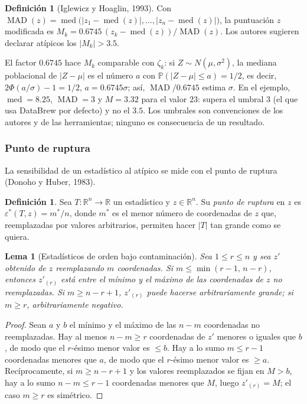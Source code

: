 \documentclass[11pt,a4paper]{article}
\theoremstyle{plain}
\newtheorem{lema}[teorema]{Lema}
\theoremstyle{definition}
\newtheorem{definicion}[teorema]{Definición}
\theoremstyle{remark}
\newcommand{\R}{\mathbb{R}}
\newcommand{\Prob}{\mathbb{P}}
\newcommand{\med}{\operatorname{med}}
\newcommand{\MAD}{\operatorname{MAD}}
\newcommand{\1}{\mathbf{1}}
\begin{document}
\begin{definicion}[Iglewicz y Hoaglin, 1993]
Con $\MAD(z)=\med\bigl(|z_1-\med(z)|,\dots,|z_n-\med(z)|\bigr)$, la
puntuación $z$ modificada es $M_k=0.6745\,(z_k-\med(z))/\MAD(z)$. Los
autores sugieren declarar atípicos los $|M_k|>3.5$.
\end{definicion}

El factor $0.6745$ hace $M_k$ comparable con $\zeta_k$: si $Z\sim
N(\mu,\sigma^2)$, la mediana poblacional de $|Z-\mu|$ es el número $a$ con
$\Prob(|Z-\mu|\le a)=1/2$, es decir, $2\Phi(a/\sigma)-1=1/2$, $a=0.6745\sigma$;
así, $\MAD/0.6745$ estima $\sigma$. En el ejemplo, $\med=8.25$, $\MAD=3$ y
$M=3.32$ para el valor $23$: supera el umbral $3$ (el que usa DataBrew
por defecto) y no el $3.5$. Los umbrales son convenciones de los autores
y de las herramientas; ninguno es consecuencia de un resultado.

\subsubsection{Punto de ruptura}\label{sec:ruptura}

La sensibilidad de un estadístico al atípico se mide con el punto de
ruptura (Donoho y Huber, 1983).

\begin{definicion}
Sea $T:\R^n\to\R$ un estadístico y $z\in\R^n$. Su \emph{punto de ruptura}
en $z$ es $\varepsilon^*(T,z)=m^*/n$, donde $m^*$ es el menor número de
coordenadas de $z$ que, reemplazadas por valores arbitrarios, permiten
hacer $|T|$ tan grande como se quiera.
\end{definicion}

\begin{lema}[Estadísticos de orden bajo contaminación]\label{lem:orden}
Sea $1\le r\le n$ y sea $z'$ obtenido de $z$ reemplazando $m$ coordenadas.
Si $m\le\min(r-1,\,n-r)$, entonces $z'_{(r)}$ está entre el mínimo y el
máximo de las coordenadas de $z$ no reemplazadas. Si $m\ge n-r+1$, $z'_{(r)}$
puede hacerse arbitrariamente grande; si $m\ge r$, arbitrariamente
negativo.
\end{lema}

\begin{proof}
Sean $a$ y $b$ el mínimo y el máximo de las $n-m$ coordenadas no
reemplazadas. Hay al menos $n-m\ge r$ coordenadas de $z'$ menores o iguales
que $b$, de modo que el $r$-ésimo menor valor es $\le b$. Hay a lo sumo
$m\le r-1$ coordenadas menores que $a$, de modo que el $r$-ésimo menor
valor es $\ge a$. Recíprocamente, si $m\ge n-r+1$ y los valores
reemplazados se fijan en $M>b$, hay a lo sumo $n-m\le r-1$ coordenadas
menores que $M$, luego $z'_{(r)}=M$; el caso $m\ge r$ es simétrico.
\end{proof}
\end{document}
